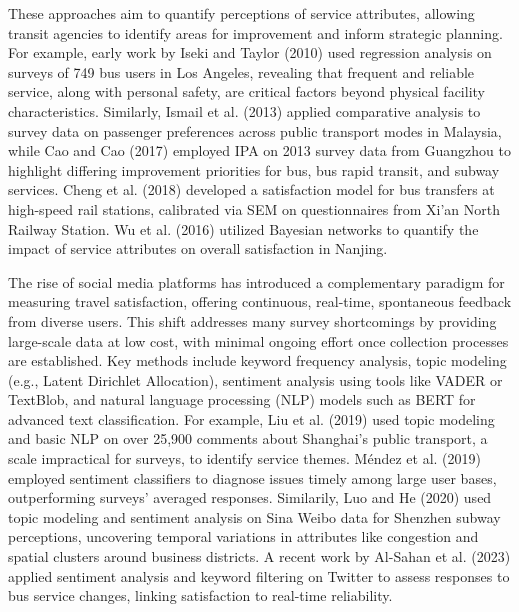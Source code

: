 \documentclass[a4paper,fleqn,12pt]{cas-sc}
\begin{document}
These approaches aim to quantify perceptions of service attributes, allowing transit agencies to identify areas for improvement and inform strategic planning. For example, early work by Iseki and Taylor (2010) used regression analysis on surveys of 749 bus users in Los Angeles, revealing that frequent and reliable service, along with personal safety, are critical factors beyond physical facility characteristics. Similarly, Ismail et al. (2013) applied comparative analysis to survey data on passenger preferences across public transport modes in Malaysia, while Cao and Cao (2017) employed IPA on 2013 survey data from Guangzhou to highlight differing improvement priorities for bus, bus rapid transit, and subway services. Cheng et al. (2018) developed a satisfaction model for bus transfers at high-speed rail stations, calibrated via SEM on questionnaires from Xi’an North Railway Station. Wu et al. (2016) utilized Bayesian networks to quantify the impact of service attributes on overall satisfaction in Nanjing.

The rise of social media platforms has introduced a complementary paradigm for measuring travel satisfaction, offering continuous, real-time, spontaneous feedback from diverse users. This shift addresses many survey shortcomings by providing large-scale data at low cost, with minimal ongoing effort once collection processes are established. Key methods include keyword frequency analysis, topic modeling (e.g., Latent Dirichlet Allocation), sentiment analysis using tools like VADER or TextBlob, and natural language processing (NLP) models such as BERT for advanced text classification. For example, Liu et al. (2019) used topic modeling and basic NLP on over 25,900 comments about Shanghai's public transport, a scale impractical for surveys, to identify service themes. Méndez et al. (2019) employed sentiment classifiers to diagnose issues timely among large user bases, outperforming surveys' averaged responses. Similarily, Luo and He (2020) used topic modeling and sentiment analysis on Sina Weibo data for Shenzhen subway perceptions, uncovering temporal variations in attributes like congestion and spatial clusters around business districts. A recent work by Al-Sahan et al. (2023) applied sentiment analysis and keyword filtering on Twitter to assess responses to bus service changes, linking satisfaction to real-time reliability. 
\end{document}
